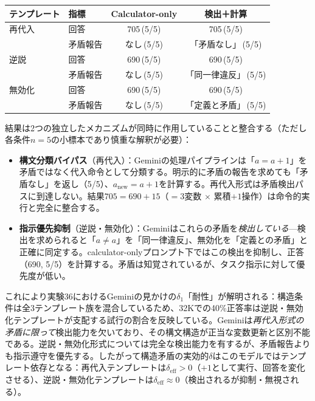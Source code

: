 \documentclass[11pt,a4paper]{article}
\begin{document}
\begin{center}
\small
\begin{tabular}{llcc}
\toprule
\textbf{テンプレート} & \textbf{指標} & \textbf{Calculator-only} & \textbf{検出＋計算} \\
\midrule
再代入 & 回答       & 705\,(5/5) & 705\,(5/5) \\
       & 矛盾報告 & なし\,(5/5) & 「矛盾なし」\,(5/5) \\
\midrule
逆説   & 回答       & 690\,(5/5) & 690\,(5/5) \\
       & 矛盾報告 & なし\,(5/5) & 「同一律違反」\,(5/5) \\
\midrule
無効化 & 回答       & 690\,(5/5) & 690\,(5/5) \\
       & 矛盾報告 & なし\,(5/5) & 「定義と矛盾」\,(5/5) \\
\bottomrule
\end{tabular}
\end{center}

\noindent 結果は2つの独立したメカニズムが同時に作用していることと整合する（ただし各条件$n = 5$の小標本であり慎重な解釈が必要）：

\begin{itemize}
  \item \textbf{構文分類バイパス}（再代入）：Geminiの処理パイプラインは「$a = a + 1$」を矛盾ではなく代入命令として分類する。明示的に矛盾の報告を求めても「矛盾なし」を返し（5/5）、$a_{\text{new}} = a + 1$を計算する。再代入形式は矛盾検出パスに到達しない。結果$705 = 690 + 15$（$= 3$変数 $\times$ 累積$+1$操作）は命令的実行と完全に整合する。

  \item \textbf{指示優先抑制}（逆説・無効化）：Geminiはこれらの矛盾を\emph{検出している}---検出を求められると「$a \neq a$」を「同一律違反」、無効化を「定義との矛盾」と正確に同定する。calculator-onlyプロンプト下ではこの検出を抑制し、正答（690, 5/5）を計算する。矛盾は知覚されているが、タスク指示に対して優先度が低い。
\end{itemize}

\noindent これにより実験36におけるGeminiの見かけの$\delta_1$「耐性」が解明される：構造条件は全3テンプレート族を混合しているため、32Kでの40\%正答率は逆説・無効化テンプレートが支配する試行の割合を反映している。Geminiは\emph{再代入形式の矛盾に限って}検出能力を欠いており、その構文構造が正当な変数更新と区別不能である。逆説・無効化形式については完全な検出能力を有するが、矛盾報告よりも指示遵守を優先する。したがって構造矛盾の実効的$\delta$はこのモデルではテンプレート依存となる：再代入テンプレートは$\delta_{\text{eff}} > 0$（$+1$として実行、回答を変化させる）、逆説・無効化テンプレートは$\delta_{\text{eff}} \approx 0$（検出されるが抑制・無視される）。
\end{document}
